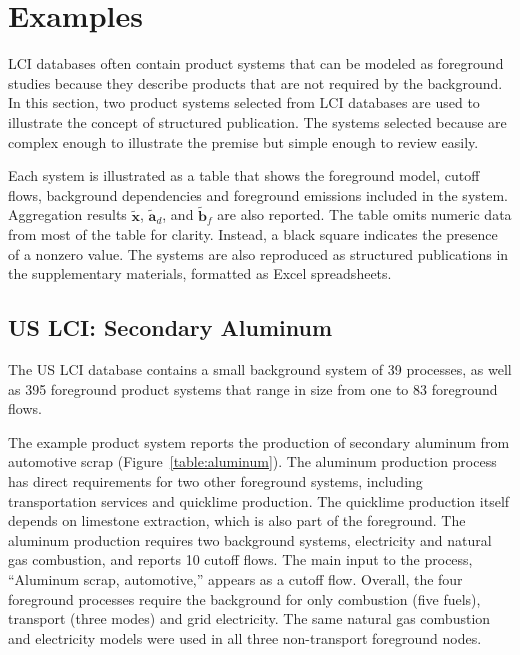 \section{Examples}

LCI databases often contain product systems that can be modeled as foreground studies because they describe products that are not required by the background.  In this section, two product systems selected from LCI databases are used to illustrate the concept of structured publication.  The systems selected because are complex enough to illustrate the premise but simple enough to review easily.

Each system is illustrated as a table that shows the foreground model, cutoff flows, background dependencies and foreground emissions included in the system.  Aggregation results $\tilde{\mathbf{x}}$, $\tilde{\mathbf{a}}_d$, and $\tilde{\mathbf{b}}_f$ are also reported.  The table omits numeric data from most of the table for clarity. Instead, a black square indicates the presence of a nonzero value.  The systems are also reproduced as structured publications in the supplementary materials, formatted as Excel spreadsheets.

\subsection{US LCI: Secondary Aluminum}



The US LCI database contains a small background system of 39 processes, as well as 395 foreground product systems that range in size from one to 83 foreground flows.

The example product system  reports the production of secondary aluminum from automotive scrap (Figure~\ref{table:aluminum}).   The aluminum production process has direct requirements for two other foreground systems, including transportation services and quicklime production.  The quicklime production itself depends on limestone extraction, which is also part of the foreground.  The aluminum production requires two background systems, electricity and natural gas combustion, and reports 10 cutoff flows.  The main input to the process, ``Aluminum scrap, automotive,'' appears as a cutoff flow.  Overall, the four foreground processes require the background for only combustion (five fuels), transport (three modes) and grid electricity.  The same natural gas combustion and electricity models were used in all three non-transport foreground nodes.

